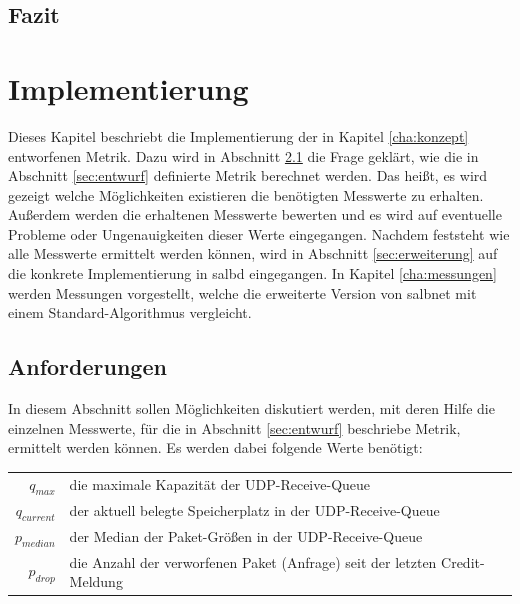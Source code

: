 \documentclass[a4paper, 12pt, BCOR10mm, DIV12, toc=bibliography, toc=listof, german]{scrbook}
\begin{document}

		\section{Fazit} %
		\label{sec:konzept-fazit}
		


	\chapter{Implementierung} %
	\label{cha:implementierung}

	Dieses Kapitel beschriebt die Implementierung der in Kapitel \ref{cha:konzept} entworfenen Metrik.
	Dazu wird in Abschnitt \ref{sec:anforderungen} die Frage geklärt, wie die in Abschnitt
	\ref{sec:entwurf} definierte Metrik berechnet werden. Das heißt, es wird gezeigt welche
	Möglichkeiten existieren die benötigten Messwerte zu erhalten. Außerdem werden die erhaltenen
	Messwerte bewerten und es wird auf eventuelle Probleme oder Ungenauigkeiten dieser Werte
	eingegangen. Nachdem feststeht wie alle Messwerte ermittelt werden können, wird in Abschnitt
	\ref{sec:erweiterung} auf die konkrete Implementierung in salbd eingegangen. In Kapitel
	\ref{cha:messungen} werden Messungen vorgestellt, welche die erweiterte Version von salbnet mit
	einem Standard-Algorithmus vergleicht.
		
		\section{Anforderungen} %
		\label{sec:anforderungen}

		In diesem Abschnitt sollen Möglichkeiten diskutiert werden, mit deren Hilfe die einzelnen
		Messwerte, für die in Abschnitt \ref{sec:entwurf} beschriebe Metrik, ermittelt werden können. Es
		werden dabei folgende Werte benötigt: $~$\\
		
		\begin{tabular}{rl}
			$q_{max}$		  & die maximale Kapazität der UDP-Receive-Queue\\
			$q_{current}$ &	der aktuell belegte Speicherplatz in der UDP-Receive-Queue\\
			$p_{median}$  &	der Median der Paket-Größen in der UDP-Receive-Queue\\
			$p_{drop}$    &	die Anzahl der verworfenen Paket (Anfrage) seit der letzten Credit-Meldung\\
		\end{tabular}
\end{document}
